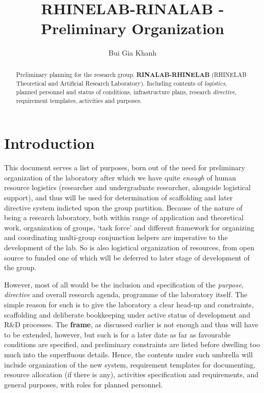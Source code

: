 \documentclass[9pt,a4paper]{article}
\title{RHINELAB-RINALAB - Preliminary Organization} %
\author{Bui Gia Khanh} %
\affiliation{} %
\begin{document}
\maketitle

\begin{abstract}
    \noindent
    Preliminary planning for the research group, \textbf{RINALAB-RHINELAB} (RHINELAB Theoretical and Artificial Research Laboratory). Including contents of \textit{logistics}, planned personnel and status of conditions, infrastructure plans, research \textit{directive}, requirement templates, activities and purposes. 

\end{abstract}

\vspace{2.5cm}



\thispagestyle{firstpage}

\pagebreak


\newgeometry{} %

\section{Introduction}

This document serves a list of purposes, born out of the need for preliminary organization of the laboratory after which we have quite \textit{enough} of human resource logistics (researcher and undergraduate researcher, alongside logistical support), and thus will be used for determination of scaffolding and later directive system indicted upon the group partition. Because of the nature of being a research laboratory, both within range of application and theoretical work, organization of groups, `task force' and different framework for organizing and coordinating multi-group conjunction helpers are imperative to the development of the lab. So is also logistical organization of resources, from open source to funded one of which will be deferred to later stage of development of the group. 

However, most of all would be the inclusion and specification of the \textit{purpose}, \textit{directive} and overall research agenda, programme of the laboratory itself. The simple reason for such is to give the laboratory a clear head-up and constraints, scaffolding and deliberate bookkeeping under active status of development and R\&D processes. The \textbf{frame}, as discussed earlier is not enough and thus will have to be extended, however, but such is for a later date as far as favourable conditions are specified, and preliminary constraints are listed before dwelling too much into the superfluous details. Hence, the contents under such umbrella will include organization of the new system, requirement templates for documenting, resource allocation (if there is any), activities specification and requirements, and general purposes, with roles for planned personnel. 
\end{document}
